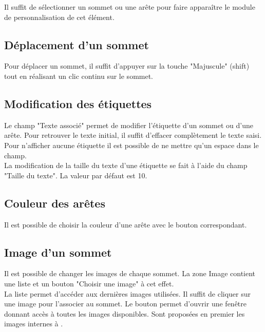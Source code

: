 Il suffit de sélectionner un sommet ou une arête pour faire apparaître le module de personnalisation de cet élément.\\

\subsection{Déplacement d'un sommet}
Pour déplacer un sommet, il suffit d'appuyer sur la touche "Majuscule" (shift) tout en réalisant un clic continu sur le sommet.\\

\subsection{Modification des étiquettes}

Le champ "Texte associé" permet de modifier l'étiquette d'un sommet ou d'une arête. Pour retrouver le texte initial, il suffit d'effacer complètement le texte saisi. Pour n'afficher aucune étiquette il est possible de ne mettre qu'un espace dans le champ.\\

La modification de la taille du texte d'une étiquette se fait à l'aide du champ "Taille du texte". La valeur par défaut est 10.\\

\subsection{Couleur des arêtes}

Il est possible de choisir la couleur d'une arête avec le bouton correspondant. \\

\subsection{Image d'un sommet}
Il est possible de changer les images de chaque sommet. La zone Image contient une liste et un bouton "Choisir une image" à cet effet.\\



La liste permet d'accéder aux dernières images utilisées. Il suffit de cliquer sur une image pour l'associer au sommet. Le bouton permet d'ouvrir une fenêtre donnant accès à toutes les images disponibles. Sont proposées en premier les images internes à \tria.\\



